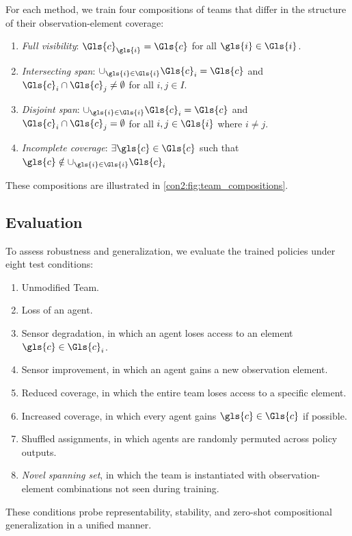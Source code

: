 For each method, we train four compositions of teams that differ in the
structure of their observation-element coverage:
\begin{enumerate}
    \item \emph{Full visibility}: \(\Gls{c}_{\gls{i}} = \Gls{c}\) for all \(\gls{i} \in \Gls{i}\).
    \item \emph{Intersecting span}: \(\cup_{\gls{i} \in \Gls{i}} \Gls{c}_i = \Gls{c}\) and 
        \(\Gls{c}_i \cap \Gls{c}_j \neq \emptyset\) for all \(i,j\in I\).
    \item \emph{Disjoint span}: \(\cup_{\gls{i} \in \Gls{i}} \Gls{c}_i = \Gls{c}\) and 
        \(\Gls{c}_i \cap \Gls{c}_j = \emptyset\) for all  \(i,j\in \Gls{i}\) where \(i\neq j\).
    \item \emph{Incomplete coverage}: \(\exists \gls{c} \in \Gls{c}\) such that 
        \(\gls{c}\notin \cup_{\gls{i} \in \Gls{i}} \Gls{c}_i\)
\end{enumerate}
These compositions are illustrated in \cref{con2:fig:team_compositions}.

\subsection{Evaluation}

To assess robustness and generalization, we evaluate the trained policies
under eight test conditions:
\begin{enumerate}
    \item Unmodified Team.
    \item Loss of an agent.
    \item Sensor degradation, in which an agent loses access to an element \(\gls{c}\in\Gls{c}_i\).
    \item Sensor improvement, in which an agent gains a new observation element.
    \item Reduced coverage, in which the entire team loses access to a specific element.
    \item Increased coverage, in which every agent gains \(\gls{c}\in\Gls{c}\) if possible.
    \item Shuffled assignments, in which agents are randomly permuted across policy outputs.
    \item \emph{Novel spanning set}, in which the team is instantiated with
        observation-element combinations not seen during training.
\end{enumerate}
These conditions probe representability, stability, and zero-shot compositional
generalization in a unified manner.

